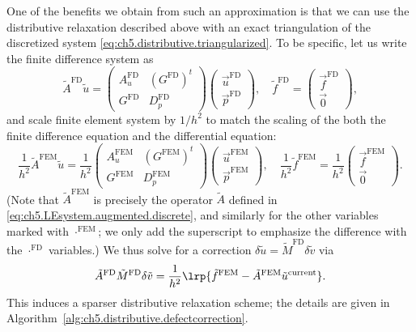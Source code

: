 One of the benefits we obtain from such an approximation is that we can use the distributive relaxation described above with an exact triangulation of the discretized system \eqref{eq:ch5.distributive.triangularized}. To be specific, let us write the finite difference system as
\begin{equation*}
\tilde{A}^{\text{FD}} \tilde{u} =
\begin{pmatrix} A_u^{\text{FD}} & (G^{\text{FD}})^t \\ G^{\text{FD}} & D_p^{\text{FD}} \end{pmatrix}
\begin{pmatrix} \vec{u}^{\text{FD}} \\ \vec{p}^{\text{FD}} \end{pmatrix}, \quad
\tilde{f}^{\text{FD}} = \begin{pmatrix} \vec{f}^{\text{FD}} \\ \vec{0} \end{pmatrix},
\end{equation*}
and scale finite element system by $1/h^2$ to match the scaling of the both the finite difference equation and the differential equation:
\begin{equation*}
\frac{1}{h^2} \tilde{A}^{\text{FEM}} \tilde{u} =
\frac{1}{h^2} \begin{pmatrix} A_u^{\text{FEM}} & (G^{\text{FEM}})^t \\ G^{\text{FEM}} & D_p^{\text{FEM}} \end{pmatrix}
\begin{pmatrix} \vec{u}^{\text{FEM}} \\ \vec{p}^{\text{FEM}} \end{pmatrix}, \quad
\frac{1}{h^2} \tilde{f}^{\text{FEM}} = \frac{1}{h^2} \begin{pmatrix} \vec{f}^{\text{FEM}} \\ \vec{0} \end{pmatrix}.
\end{equation*}
(Note that $\tilde{A}^{\text{FEM}}$ is precisely the operator $\tilde{A}$ defined in \eqref{eq:ch5.LEsystem.augmented.discrete}, and similarly for the other variables marked with $\cdot^{\text{FEM}}$; we only add the superscript to emphasize the difference with the $\cdot^{\text{FD}}$ variables.) We thus solve for a correction $\delta\tilde{u} = \tilde{M}^{\text{FD}} \delta\tilde{v}$ via
\begin{equation*}
\tilde{A}^{\text{FD}} \tilde{M}^{\text{FD}} \delta\tilde{v} = \frac{1}{h^2} \lrp{\tilde{f}^{\text{FEM}} - \tilde{A}^{\text{FEM}} \tilde{u}^{\text{current}}}.
\end{equation*}
This induces a sparser distributive relaxation scheme; the details are given in Algorithm~\ref{alg:ch5.distributive.defectcorrection}.

